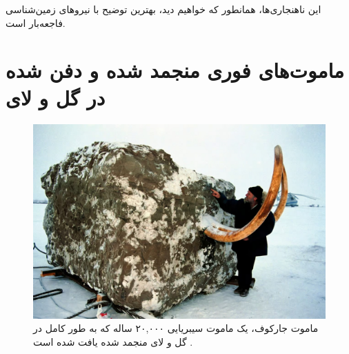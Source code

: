 \documentclass[10pt,twocolumn,letterpaper]{article}
\begin{document}
این ناهنجاری‌ها، همانطور که خواهیم دید، بهترین توضیح با نیروهای زمین‌شناسی فاجعه‌بار است.

\section{ماموت‌های فوری منجمد شده و دفن شده در گل و لای}

\begin{figure}[t]
\begin{center}
   \includegraphics[width=1\linewidth]{jarkov-mammoth.jpg}
\end{center}
   \caption{ماموت جارکوف، یک ماموت سیبریایی ۲۰,۰۰۰ ساله که به طور کامل در گل و لای منجمد شده یافت شده است \cite{51}.}
\label{fig:1}
\label{fig:onecol}
\end{figure}
\end{document}
